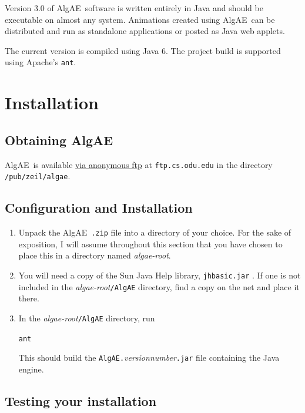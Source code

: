 \documentclass[11pt,titlepage]{book}
\newcommand{\algae}{{\sc AlgAE}}
\begin{document}
Version 3.0 of \algae\ software is written entirely in Java and should
be executable on almost any system. Animations created using
\algae\ can be distributed and run as standalone applications or
posted as Java web applets.

The current version is compiled using Java 6. The project build is
supported using Apache's \texttt{ant}\cite{Apache/ant}.


\chapter{Installation}

\section{Obtaining \algae}

\algae\ is available \href{ftp://ftp.cs.odu.edu/pub/zeil/algae/algae-3.0.zip}{via anonymous ftp} at {\tt ftp.cs.odu.edu} in the
directory {\tt /pub/zeil/algae}.



\section{Configuration and Installation}

\newcommand{\Root}{{\em algae-root}}
\newcommand{\Platform}{{\em platform}}

\begin{enumerate}
\item Unpack the \algae\ {\tt .zip} file into a directory of your
choice.  For the sake of exposition, I will assume throughout this
section that you have chosen to place this in a directory named
\Root. 

\item You will need a copy of the Sun Java Help library, \texttt{jhbasic.jar} \cite{Sun/help}. If one is not included in the \Root\texttt{/AlgAE} directory, find a copy on the net and place it there.

\item In the \Root\texttt{/AlgAE} directory, run
\begin{alltt}
ant
\end{alltt}
This should build the \texttt{AlgAE.}\textit{versionnumber}\texttt{.jar} file containing the Java engine.


\end{enumerate}



\section{Testing your installation}
\end{document}
